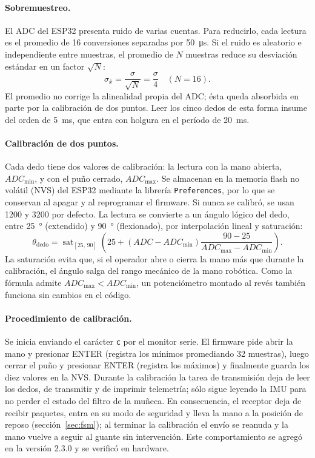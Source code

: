 \paragraph{Sobremuestreo.} El ADC del ESP32 presenta ruido de varias cuentas. Para reducirlo, cada lectura es el promedio de 16 conversiones separadas por \SI{50}{\micro\second}. Si el ruido es aleatorio e independiente entre muestras, el promedio de $N$ muestras reduce su desviación estándar en un factor $\sqrt{N}$:
\begin{equation}
\sigma_{\bar{x}} = \frac{\sigma}{\sqrt{N}} = \frac{\sigma}{4} \quad (N = 16).
\end{equation}
El promedio no corrige la alinealidad propia del ADC; ésta queda absorbida en parte por la calibración de dos puntos. Leer los cinco dedos de esta forma insume del orden de \SI{5}{\milli\second}, que entra con holgura en el período de \SI{20}{\milli\second}.

\paragraph{Calibración de dos puntos.}
\label{sec:calibracion_dedos}
Cada dedo tiene dos valores de calibración: la lectura con la mano abierta, $ADC_{\min}$, y con el puño cerrado, $ADC_{\max}$. Se almacenan en la memoria flash no volátil (NVS) del ESP32 mediante la librería \texttt{Preferences}, por lo que se conservan al apagar y al reprogramar el firmware. Si nunca se calibró, se usan 1200 y 3200 por defecto. La lectura se convierte a un ángulo lógico del dedo, entre \SI{25}{\degree} (extendido) y \SI{90}{\degree} (flexionado), por interpolación lineal y saturación:
\begin{equation}
\theta_{\text{dedo}} = \operatorname{sat}_{[25,\,90]}\!\left( 25 + \left(ADC - ADC_{\min}\right)\frac{90 - 25}{ADC_{\max} - ADC_{\min}} \right).
\end{equation}
La saturación evita que, si el operador abre o cierra la mano más que durante la calibración, el ángulo salga del rango mecánico de la mano robótica. Como la fórmula admite $ADC_{\max} < ADC_{\min}$, un potenciómetro montado al revés también funciona sin cambios en el código.

\paragraph{Procedimiento de calibración.} Se inicia enviando el carácter \texttt{c} por el monitor serie. El firmware pide abrir la mano y presionar ENTER (registra los mínimos promediando 32 muestras), luego cerrar el puño y presionar ENTER (registra los máximos) y finalmente guarda los diez valores en la NVS. Durante la calibración la tarea de transmisión deja de leer los dedos, de transmitir y de imprimir telemetría; sólo sigue leyendo la IMU para no perder el estado del filtro de la muñeca. En consecuencia, el receptor deja de recibir paquetes, entra en su modo de seguridad y lleva la mano a la posición de reposo (sección~\ref{sec:fsm}); al terminar la calibración el envío se reanuda y la mano vuelve a seguir al guante sin intervención. Este comportamiento se agregó en la versión 2.3.0 y se verificó en hardware.

